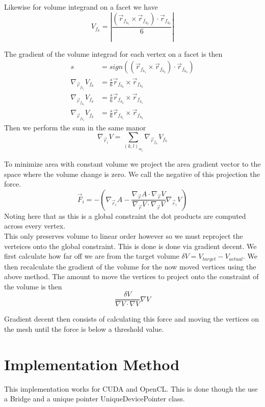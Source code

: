 \documentclass[]{article}
\begin{document}
Likewise for volume integrand on a facet we have
$$V_{f_{k}} = \left|\frac{(\vec{r}_{f_{k_1}} \times \vec{r}_{f_{k_2}}) \cdot \vec{r}_{f_{k_3}}}{6}\right|$$

The gradient of the volume integrad for each vertex on a facet is then
\begin{align}
s &= sign((\vec{r}_{f_{k_1}} \times \vec{r}_{f_{k_2}}) \cdot \vec{r}_{f_{k_3}})\\
\nabla_{\vec{r}_{f_{k_1}}}V_{f_k} &=\frac{s}{6}\vec{r}_{f_{k_2}} \times \vec{r}_{f_{k_3}}\\
\nabla_{\vec{r}_{f_{k_2}}}V_{f_k} &=\frac{s}{6}\vec{r}_{f_{k_3}} \times \vec{r}_{f_{k_1}}\\
\nabla_{\vec{r}_{f_{k_3}}}V_{f_k} &=\frac{s}{6}\vec{r}_{f_{k_1}} \times \vec{r}_{f_{k_2}}
\end{align}
Then we perform the sum in the same manor 
$$\nabla_{\vec{r}_i} V = \sum_{(k,l)_{m_i}} \nabla_{\vec{r}_{f_{k_l}}}V_{f_k}$$

To minimize area with constant volume we project the area gradient vector to the space where the volume change is zero. We call the negative of this projection the force. 
$$ \vec{F}_i = -\left(\nabla_{\vec{r}_i} A - \frac{\nabla_{\vec{r}} A \cdot \nabla_{\vec{r}} V}{\nabla_{\vec{r}} V \cdot \nabla_{\vec{r}} V}\nabla_{\vec{r}_i} V\right)$$
Noting here that as this is a global constraint the dot products are computed across every vertex.\\

This only preserves volume to linear order however so we must reproject the verteices onto the global constraint. This is done is done via gradient decent. We first calculate how far off we are from the target volume $\delta V = V_{target}-V_{actual}$. We then recalculate the gradient of the volume for the now moved vertices using the above method. The amount to move the vertices to project onto the constraint of the volume is then
$$\frac{\delta V}{\nabla V \cdot \nabla V} \nabla V$$


Gradient decent then consists of calculating this force and moving the vertices on the mesh until the force is below a threshold value. 

\section{Implementation Method}
This implementation works for CUDA and OpenCL. This is done though the use a Bridge and a unique pointer UniqueDevicePointer class.
\end{document}
